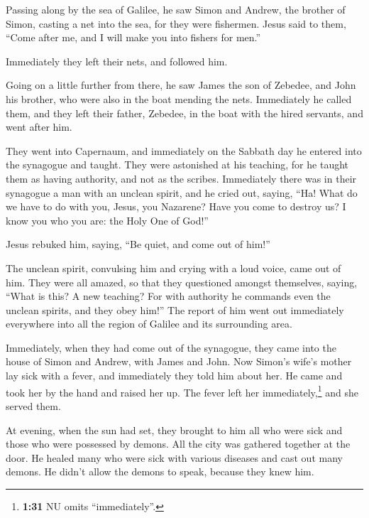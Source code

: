  Passing along by the sea of Galilee, he saw Simon and
Andrew, the brother of Simon, casting a net into the sea, for they were
fishermen.  Jesus said to them, ``Come after me, and I
will make you into fishers for men.''

 Immediately they left their nets, and followed him.

 Going on a little further from there, he saw James the
son of Zebedee, and John his brother, who were also in the boat mending
the nets.  Immediately he called them, and they left
their father, Zebedee, in the boat with the hired servants, and went
after him.

 They went into Capernaum, and immediately on the Sabbath
day he entered into the synagogue and taught.  They were
astonished at his teaching, for he taught them as having authority, and
not as the scribes.  Immediately there was in their
synagogue a man with an unclean spirit, and he cried out,
 saying, ``Ha! What do we have to do with you, Jesus, you
Nazarene? Have you come to destroy us? I know you who you are: the Holy
One of God!''

 Jesus rebuked him, saying, ``Be quiet, and come out of
him!''

 The unclean spirit, convulsing him and crying with a
loud voice, came out of him.  They were all amazed, so
that they questioned amongst themselves, saying, ``What is this? A new
teaching? For with authority he commands even the unclean spirits, and
they obey him!''  The report of him went out immediately
everywhere into all the region of Galilee and its surrounding area.

 Immediately, when they had come out of the synagogue,
they came into the house of Simon and Andrew, with James and John.
 Now Simon's wife's mother lay sick with a fever, and
immediately they told him about her.  He came and took
her by the hand and raised her up. The fever left her
immediately,\footnote{\textbf{1:31} NU omits ``immediately''.} and she
served them.

 At evening, when the sun had set, they brought to him
all who were sick and those who were possessed by demons.
 All the city was gathered together at the door.
 He healed many who were sick with various diseases and
cast out many demons. He didn't allow the demons to speak, because they
knew him.


